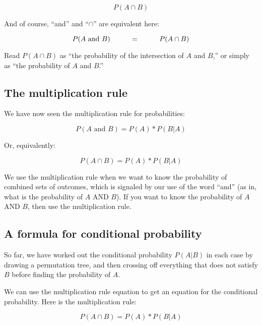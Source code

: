 \documentclass[../../../main.tex]{subfiles}
\begin{document}
\begin{equation*}
  P(A \cap B)
\end{equation*}

\noindent
And of course, ``and'' and ``$\cap$'' are equivalent here:

\begin{equation*}
  P(A \text{ and } B) \hskip 1cm = \hskip 1cm P(A \cap B)
\end{equation*}

\noindent
Read $P(A \cap B)$ as ``the probability of the intersection of $A$ and $B$,'' or simply as ``the probability of $A$ and $B$.''


\subsection{The multiplication rule}

We have now seen the multiplication rule for probabilities:

\begin{equation*}
  P(A \text{ and } B) = P(A) * P(B | A)
\end{equation*}

\noindent
Or, equivalently:

\begin{equation*}
  P(A \cap B) = P(A) * P(B | A)
\end{equation*}

\noindent
We use the multiplication rule when we want to know the probability of combined sets of outcomes, which is signaled by our use of the word ``and'' (as in, what is the probability of $A$ AND $B$). If you want to know the probability of $A$ AND $B$, then use the multiplication rule.


\subsection{A formula for conditional probability}

So far, we have worked out the conditional probability $P(A | B)$ in each case by drawing a permutation tree, and then crossing off everything that does not satisfy $B$ before finding the probability of $A$.

We can use the multiplication rule equation to get an equation for the conditional probability. Here is the multiplication rule:

\begin{equation*}
  P(A \cap B) = P(A) * P(B | A)
\end{equation*}
\end{document}
